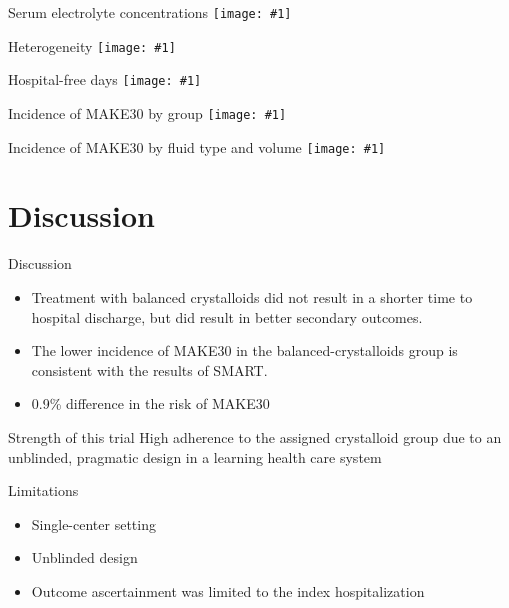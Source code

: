 \documentclass{beamer}
\newcommand*{\solo}[1]{\centering\texttt{[image: \#1]}}
\begin{document}
\begin{frame}{Serum electrolyte concentrations}
    \solo{F1.eps}
\end{frame}

\begin{frame}{Heterogeneity}
    \solo{F2.eps}
\end{frame}

\begin{frame}{Hospital-free days}
    \solo{S4.eps}
\end{frame}

\begin{frame}{Incidence of MAKE30 by group}
    \solo{S5.eps}
\end{frame}

\begin{frame}{Incidence of MAKE30 by fluid type and volume}
    \solo{S6.eps}
\end{frame}

\section{Discussion}
\begin{frame}{Discussion}
    \begin{itemize}
        \item Treatment with balanced crystalloids did not result in a shorter
            time to hospital discharge, but did result in better secondary
            outcomes.
        \item The lower incidence of MAKE30 in the balanced-crystalloids group
            is consistent with the results of SMART.
        \item 0.9\% difference in the risk of MAKE30
    \end{itemize}
\end{frame}

\begin{frame}{Strength of this trial}
    High adherence to the assigned crystalloid group due to an unblinded,
    pragmatic design in a learning health care system
\end{frame}

\begin{frame}{Limitations}
    \begin{itemize}
        \item Single-center setting
        \item Unblinded design
        \item Outcome ascertainment was limited to the index hospitalization
    \end{itemize}
\end{frame}
\end{document}
